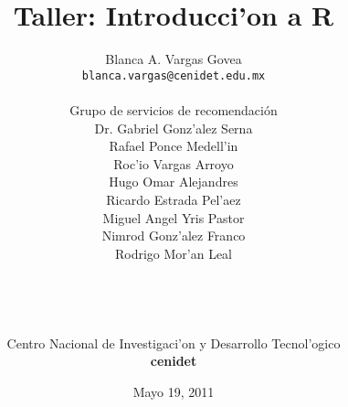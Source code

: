 \documentclass[11pt]{report}
\begin{document}
\title{\textbf{\huge{Taller: Introducci'on a R}}}
\author{Blanca A. Vargas Govea\\\texttt{blanca.vargas@cenidet.edu.mx}\\\\Grupo de servicios de recomendaci\'{o}n\\Dr. Gabriel Gonz'alez Serna\\Rafael Ponce Medell'in\\Roc'io Vargas Arroyo\\Hugo Omar Alejandres\\Ricardo Estrada Pel'aez\\Miguel Angel Yris Pastor\\Nimrod Gonz'alez Franco\\Rodrigo Mor'an Leal\\\\\\\\\\Centro Nacional de Investigaci'on y Desarrollo Tecnol'ogico\\\large{\textbf{cenidet}}}
\date{Mayo 19, 2011}
\maketitle
\tableofcontents






%

\end{document}
